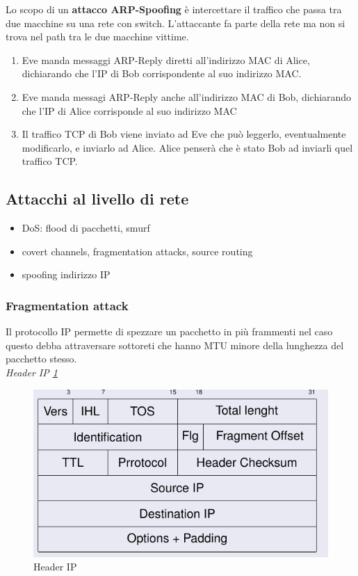 \documentclass[12pt]{article}
\begin{document}
				Lo scopo di un \textbf{attacco ARP-Spoofing} è intercettare il traffico che passa tra due macchine su una rete con switch. L'attaccante fa parte della rete ma non si trova nel path tra le due macchine vittime.	
				\begin{enumerate}
					\item Eve manda messaggi ARP-Reply diretti all'indirizzo MAC di Alice, dichiarando che l'IP di Bob corrispondente al suo indirizzo MAC.
					\item Eve manda messagi ARP-Reply anche all'indirizzo MAC di Bob, dichiarando che l'IP di Alice corrisponde al suo indirizzo MAC
					\item Il traffico TCP di Bob viene inviato ad Eve che può leggerlo, eventualmente modificarlo, e inviarlo ad Alice. Alice penserà che è stato Bob ad inviarli quel traffico TCP. 
				\end{enumerate}
		\subsection{Attacchi al livello di rete}
			\begin{itemize}
				\item DoS: flood di pacchetti, smurf
				\item covert channels, fragmentation attacks, source routing
				\item spoofing indirizzo IP
			\end{itemize}
			\subsubsection{Fragmentation attack}
				Il protocollo IP permette di spezzare un pacchetto in più frammenti nel caso questo debba attraversare sottoreti che hanno MTU minore della lunghezza del pacchetto stesso. \\
				
				\textit{Header IP \ref{fig:25}}\\
				\begin{figure}[h!]
					\centering
					\includegraphics[scale=0.60]{img/iphead.PNG}
					\caption{Header IP \label{fig:25}}
				\end{figure}\\
				
\end{document}
